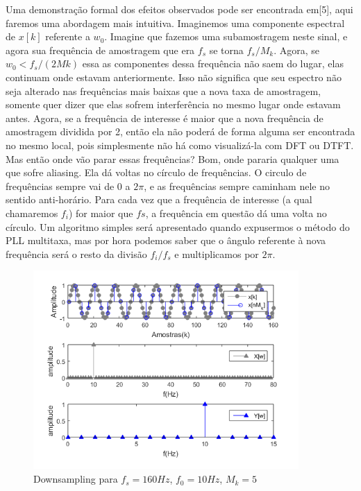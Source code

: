 \documentclass[a4paper, 12pt]{book}
\begin{document}
\indent Uma demonstração formal dos efeitos observados pode ser encontrada em[5], aqui faremos uma abordagem mais intuitiva. Imaginemos uma componente espectral de $x[k]$ referente a $w_0$. Imagine que fazemos uma subamostragem neste sinal, e agora sua frequência de amostragem que era $f_s$ se torna $f_s/M_k$. Agora, se $w_0<f_s/(2Mk)$ essa as componentes dessa frequência não saem do lugar, elas continuam onde estavam anteriormente. Isso não significa que seu espectro não seja alterado nas frequências mais baixas que a nova taxa de amostragem, somente quer dizer que elas sofrem interferência no mesmo lugar onde estavam antes. Agora, se a frequência de interesse é maior que a nova frequência de amostragem dividida por 2, então ela não poderá de forma alguma ser encontrada no mesmo local, pois simplesmente não há como visualizá-la com DFT ou DTFT. Mas então onde vão parar essas frequências? Bom, onde pararia qualquer uma que sofre aliasing. Ela dá voltas no círculo de frequências. O circulo de frequências sempre vai de 0 a $2\pi$, e as frequências sempre caminham nele no sentido anti-horário. Para cada vez que a frequência de interesse (a qual chamaremos $f_i$) for maior que $fs$, a frequência em questão dá uma volta no círculo. Um algoritmo simples será apresentado quando expusermos o método do PLL multitaxa, mas por hora podemos saber que o ângulo referente à nova frequência será o resto da divisão $f_i/f_s$ e multiplicamos por $2\pi$. 

\begin{figure}[h]
	\centering
	\includegraphics[width=0.9\textwidth]{../figuras/downsample.png}
	\caption{Downsampling para $f_s=160Hz$, $f_0=10Hz$, $M_k=5$}
	\label{fig:f5}
\end{figure}
\end{document}
